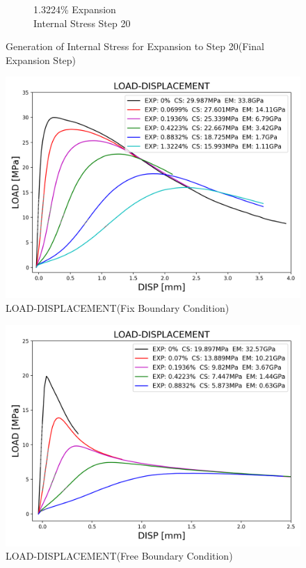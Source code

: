\begin{figure}[ht!]
\begin{subfigure}{.25\textwidth}
      \caption{1.3224\% Expansion\\Internal Stress Step 20}
    \end{subfigure}

\caption{Generation of Internal Stress for Expansion to Step 20(Final Expansion Step)}
\label{fig:A30_stress}
\end{figure}


\begin{figure}[ht!]
    \centering
    \includegraphics[width=0.8\linewidth]{Files/exp_3D/ASR/S13A30P75FIX-LOAD-DISPLACEMENT.png}
    \caption{LOAD-DISPLACEMENT(Fix Boundary Condition)}
    \label{fig:S13A30P75FIX-LOAD-DISPLACEMENT}
\end{figure}

\begin{figure}[ht!]
    \centering
    \includegraphics[width=0.8\linewidth]{Files/exp_3D/ASR/S13A30P75FREE-LOAD-DISPLACEMENT.png}
    \caption{LOAD-DISPLACEMENT(Free Boundary Condition)}
    \label{fig:S13A30P75FREE-LOAD-DISPLACEMENT}
\end{figure}

